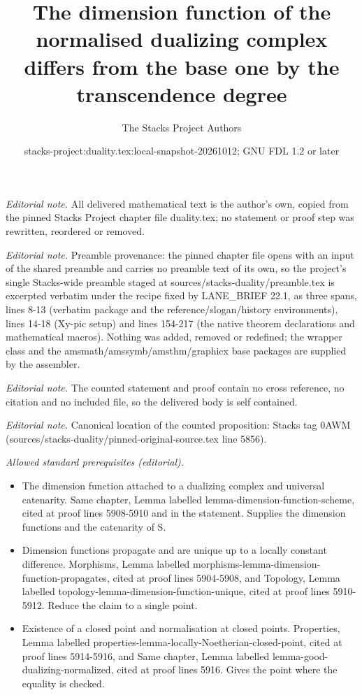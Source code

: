 \documentclass[10pt,a4paper]{amsart}
\title{The dimension function of the normalised dualizing complex differs from the base one by the transcendence degree}
\author{The Stacks Project Authors}
\date{stacks-project:duality.tex:local-snapshot-20261012; GNU FDL 1.2 or later}
\theoremstyle{plain}
\theoremstyle{definition}
\theoremstyle{remark}
\numberwithin{equation}{subsection}
\begin{document}
\maketitle
\noindent\textit{Editorial note.} All delivered mathematical text is the author's own, copied from the pinned Stacks Project chapter file duality.tex; no statement or proof step was rewritten, reordered or removed.\par\medskip
\noindent\textit{Editorial note.} Preamble provenance: the pinned chapter file opens with an input of the shared preamble and carries no preamble text of its own, so the project's single Stacks-wide preamble staged at sources/stacks-duality/preamble.tex is excerpted verbatim under the recipe fixed by LANE\_BRIEF 22.1, as three spans, lines 8-13 (verbatim package and the reference/slogan/history environments), lines 14-18 (Xy-pic setup) and lines 154-217 (the native theorem declarations and mathematical macros). Nothing was added, removed or redefined; the wrapper class and the amsmath/amssymb/amsthm/graphicx base packages are supplied by the assembler.\par\medskip
\noindent\textit{Editorial note.} The counted statement and proof contain no cross reference, no citation and no included file, so the delivered body is self contained.\par\medskip
\noindent\textit{Editorial note.} Canonical location of the counted proposition: Stacks tag 0AWM (sources/stacks-duality/pinned-original-source.tex line 5856).\par\medskip
\noindent\textit{Allowed standard prerequisites (editorial).}\begin{itemize}
\item The dimension function attached to a dualizing complex and universal catenarity. Same chapter, Lemma labelled lemma-dimension-function-scheme, cited at proof lines 5908-5910 and in the statement. Supplies the dimension functions and the catenarity of S.
\item Dimension functions propagate and are unique up to a locally constant difference. Morphisms, Lemma labelled morphisms-lemma-dimension-function-propagates, cited at proof lines 5904-5908, and Topology, Lemma labelled topology-lemma-dimension-function-unique, cited at proof lines 5910-5912. Reduce the claim to a single point.
\item Existence of a closed point and normalisation at closed points. Properties, Lemma labelled properties-lemma-locally-Noetherian-closed-point, cited at proof lines 5914-5916, and Same chapter, Lemma labelled lemma-good-dualizing-normalized, cited at proof lines 5916. Gives the point where the equality is checked.
\end{itemize}\medskip
\end{document}
